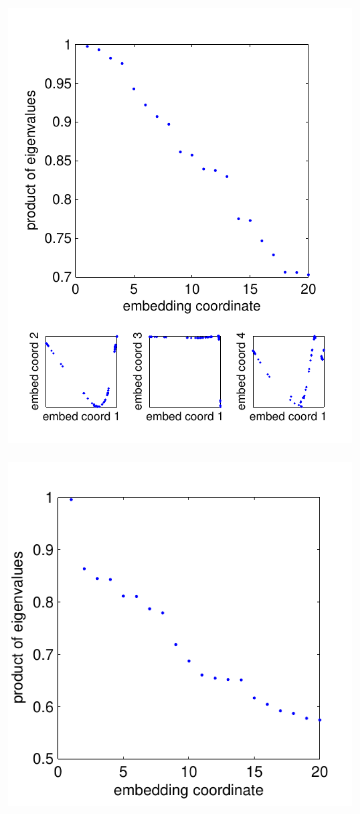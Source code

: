 \begin{figure}
\begin{subfigure}{0.22\textwidth}
\includegraphics[width=\textwidth]{figS4}
\caption{}
\end{subfigure}
%
\begin{subfigure}{0.22\textwidth}
\includegraphics[width=\textwidth]{figS5}

\end{subfigure}
\end{figure}
